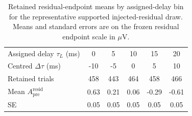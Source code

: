 \begin{table}[H]
\centering
\caption{Retained residual-endpoint means by assigned-delay bin for the representative supported injected-residual draw. Means and standard errors are on the frozen residual endpoint scale in \(\mu\mathrm{V}\).}
\label{tab:si-worked-bins}
\footnotesize
\setlength{\tabcolsep}{4pt}
\begin{tabular}{lccccc}
\toprule
Assigned delay \(\tau_L\) (ms) & 0 & 5 & 10 & 15 & 20 \\
Centred \(\Delta\tau\) (ms) & -10 & -5 & 0 & 5 & 10 \\
\midrule
Retained trials & 458 & 443 & 464 & 458 & 466 \\
Mean \(A^{\mathrm{resid}}_{\mathrm{pre}}\) & 0.63 & 0.21 & 0.06 & -0.29 & -0.61 \\
SE & 0.05 & 0.05 & 0.05 & 0.05 & 0.05 \\
\bottomrule
\end{tabular}
\end{table}
